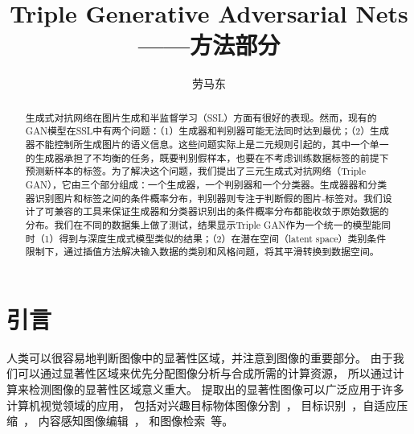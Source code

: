 \documentclass[10pt,twocolumn,letterpaper]{article}
\begin{document}

\newcommand{\figref}[1]{图\ref{#1}}
\newcommand{\tabref}[1]{表\ref{#1}}
\newcommand{\equref}[1]{式\ref{#1}}
\newcommand{\secref}[1]{第\ref{#1}节}


\title{Triple Generative Adversarial Nets——方法部分}

\author{劳马东}

\maketitle

\begin{abstract}
生成式对抗网络在图片生成和半监督学习（SSL）方面有很好的表现。然而，现有的GAN模型在SSL中有两个问题：（1）生成器和判别器可能无法同时达到最优；（2）生成器不能控制所生成图片的语义信息。这些问题实际上是二元规则引起的，其中一个单一的生成器承担了不均衡的任务，既要判别假样本，也要在不考虑训练数据标签的前提下预测新样本的标签。为了解决这个问题，我们提出了三元生成式对抗网络（Triple GAN），它由三个部分组成：一个生成器，一个判别器和一个分类器。生成器器和分类器识别图片和标签之间的条件概率分布，判别器则专注于判断假的图片-标签对。我们设计了可兼容的工具来保证生成器和分类器识别出的条件概率分布都能收敛于原始数据的分布。我们在不同的数据集上做了测试，结果显示Triple GAN作为一个统一的模型能同时（1）得到与深度生成式模型类似的结果；（2）在潜在空间（latent space）类别条件限制下，通过插值方法解决输入数据的类别和风格问题，将其平滑转换到数据空间。
\end{abstract}


\section{引言}\label{sec:Introduction}

人类可以很容易地判断图像中的显著性区域，并注意到图像的重要部分。
由于我们可以通过显著性区域来优先分配图像分析与合成所需的计算资源，
所以通过计算来检测图像的显著性区域意义重大。
提取出的显著性图像可以广泛应用于许多计算机视觉领域的应用，
包括对兴趣目标物体图像分割~\cite{06TCSVT/han_unsupervised,06josa/KoN_InterestSegmentation}，
目标识别~\cite{04cvpr/RutishauserWWKP}，自适应压缩~\cite{00CE/christopoulos_jpeg}，
内容感知图像编辑~\cite{TOG/Wang08,09cgf/ZhangC,wu-2010-resizing,10vc/Ding}，
和图像检索~\cite{tog09/ChenCT_Sketch2Photo}等。
\end{document}
